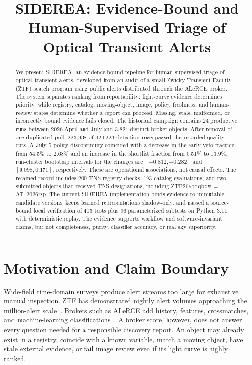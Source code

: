 \documentclass[10pt,conference]{IEEEtran}
\title{SIDEREA: Evidence-Bound and Human-Supervised Triage of Optical Transient Alerts}
\author{\IEEEauthorblockN{Anonymous Authors}}
\begin{document}
\maketitle

\begin{abstract}
We present SIDEREA, an evidence-bound pipeline for human-supervised triage of optical transient alerts, developed from an audit of a small Zwicky Transient Facility (ZTF) search program using public alerts distributed through the ALeRCE broker. The system separates ranking from reportability: light-curve evidence determines priority, while registry, catalog, moving-object, image, policy, freshness, and human-review states determine whether a report can proceed. Missing, stale, malformed, or incorrectly bound evidence fails closed. The historical campaign contains 24 productive runs between 2026 April and July and 3,824 distinct broker objects. After removal of one duplicated pull, 223,938 of 424,223 detection rows passed the recorded quality cuts. A July 5 policy discontinuity coincided with a decrease in the early-veto fraction from 54.5\% to 2.68\% and an increase in the shortlist fraction from 0.51\% to 13.9\%; run-cluster bootstrap intervals for the changes are $[-0.812,-0.282]$ and $[0.098,0.171]$, respectively. These are operational associations, not causal effects. The retained record includes 200 TNS registry checks, 193 catalog evaluations, and two submitted objects that received TNS designations, including ZTF26abdqbqw = AT~2026rsp. The current SIDEREA implementation binds evidence to immutable candidate versions, keeps learned representations shadow-only, and passed a source-bound local verification of 405 tests plus 96 parameterized subtests on Python 3.11 with deterministic replay. The evidence supports workflow and software-invariant claims, but not completeness, purity, classifier accuracy, or real-sky superiority.
\end{abstract}

\section{Motivation and Claim Boundary}
Wide-field time-domain surveys produce alert streams too large for exhaustive manual inspection. ZTF has demonstrated nightly alert volumes approaching the million-alert scale~\citep{bellm2019,graham2019,patterson2019}. Brokers such as ALeRCE add history, features, crossmatches, and machine-learning classifications~\citep{forster2021,carrascodavis2021,sanchezsaez2021}. A broker score, however, does not answer every question needed for a responsible discovery report. An object may already exist in a registry, coincide with a known variable, match a moving object, have stale external evidence, or fail image review even if its light curve is highly ranked.
\end{document}
